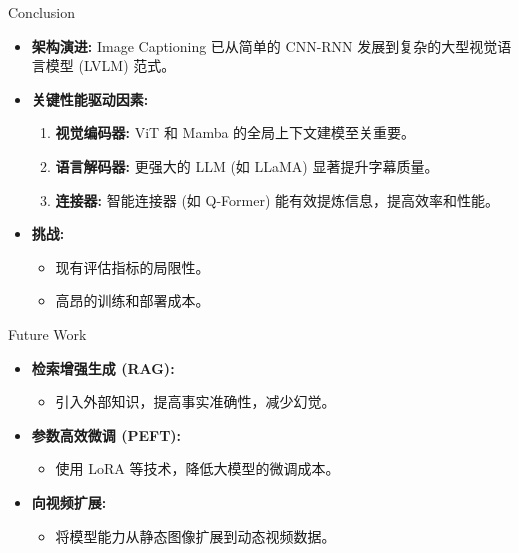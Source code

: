 \documentclass{beamer}
\begin{document}
\begin{CJK}{UTF8}{gbsn}
\begin{frame}{Conclusion}
    \begin{itemize}
        \item \textbf{架构演进:} Image Captioning 已从简单的 CNN-RNN 发展到复杂的大型视觉语言模型 (LVLM) 范式。
        \medskip
        \item \textbf{关键性能驱动因素:}
        \begin{enumerate}
            \item \textbf{视觉编码器:} ViT 和 Mamba 的全局上下文建模至关重要。
            \item \textbf{语言解码器:} 更强大的 LLM (如 LLaMA) 显著提升字幕质量。
            \item \textbf{连接器:} 智能连接器 (如 Q-Former) 能有效提炼信息，提高效率和性能。
        \end{enumerate}
        \medskip
        \item \textbf{挑战:}
        \begin{itemize}
            \item 现有评估指标的局限性。
            \item 高昂的训练和部署成本。
        \end{itemize}
    \end{itemize}
\end{frame}

\begin{frame}{Future Work}
    \begin{itemize}
        \item \textbf{检索增强生成 (RAG):}
        \begin{itemize}
            \item 引入外部知识，提高事实准确性，减少幻觉。
        \end{itemize}
        \medskip
        
        \item \textbf{参数高效微调 (PEFT):}
        \begin{itemize}
            \item 使用 LoRA 等技术，降低大模型的微调成本。
        \end{itemize}
        \medskip
        
        \item \textbf{向视频扩展:}
        \begin{itemize}
            \item 将模型能力从静态图像扩展到动态视频数据。
        \end{itemize}
        \medskip
        

\end{itemize}
\end{frame}
\end{CJK}
\end{document}
